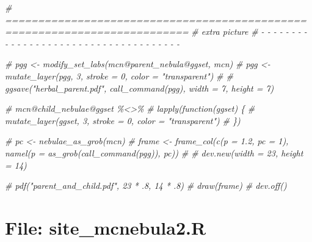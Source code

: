 \documentclass[
]{article}
\newenvironment{Shaded}{\begin{snugshade}}{\end{snugshade}}
\newcommand{\CommentTok}[1]{\textcolor[rgb]{0.56,0.35,0.01}{\textit{#1}}}
\begin{document}
\begin{Shaded}
\begin{Highlighting}[]
\CommentTok{\# ==========================================================================}
\CommentTok{\# extra picture}
\CommentTok{\# {-} {-} {-} {-} {-} {-} {-} {-} {-} {-} {-} {-} {-} {-} {-} {-} {-} {-} {-} {-} {-} {-} {-} {-} {-} {-} {-} {-} {-} {-} {-} {-} {-} {-} {-} {-} {-}}

\CommentTok{\# pgg \textless{}{-} modify\_set\_labs(mcn@parent\_nebula@ggset, mcn)}
\CommentTok{\# pgg \textless{}{-} mutate\_layer(pgg, 3, stroke = 0, color = "transparent")}
\CommentTok{\# \# ggsave("herbal\_parent.pdf", call\_command(pgg), width = 7, height = 7)}

\CommentTok{\# mcn@child\_nebulae@ggset \%\textless{}\textgreater{}\%}
\CommentTok{\#   lapply(function(ggset) \{}
\CommentTok{\#     mutate\_layer(ggset, 3, stroke = 0, color = "transparent")}
\CommentTok{\# \})}

\CommentTok{\# pc \textless{}{-} nebulae\_as\_grob(mcn)}
\CommentTok{\# frame \textless{}{-} frame\_col(c(p = 1.2, pc = 1), namel(p = as\_grob(call\_command(pgg)), pc))}
\CommentTok{\# \# dev.new(width = 23, height = 14)}

\CommentTok{\# pdf("parent\_and\_child.pdf", 23 * .8, 14 * .8)}
\CommentTok{\# draw(frame)}
\CommentTok{\# dev.off()}
\end{Highlighting}
\end{Shaded}

\hypertarget{file-site_mcnebula2.r}{%
\section{File: site\_mcnebula2.R}\label{file-site_mcnebula2.r}}
\end{document}
